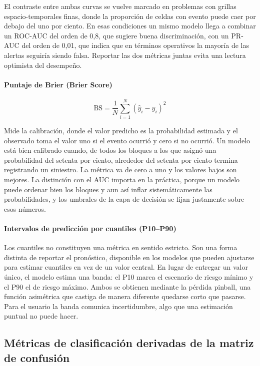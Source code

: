 El contraste entre ambas curvas se vuelve marcado en problemas con grillas espacio-temporales finas, donde la proporción de celdas con evento puede caer por debajo del uno por ciento. En esas condiciones un mismo modelo llega a combinar un ROC-AUC del orden de 0,8, que sugiere buena discriminación, con un PR-AUC del orden de 0,01, que indica que en términos operativos la mayoría de las alertas seguiría siendo falsa. Reportar las dos métricas juntas evita una lectura optimista del desempeño.

\paragraph{Puntaje de Brier (Brier Score)}

\begin{equation}
\mathrm{BS} = \frac{1}{N} \sum_{i=1}^{N} \left( \hat{y}_i - y_i \right)^{2}
\label{eq:brier}
\end{equation}

Mide la calibración, donde el valor predicho es la probabilidad estimada y el observado toma el valor uno si el evento ocurrió y cero si no ocurrió. Un modelo está bien calibrado cuando, de todos los bloques a los que asignó una probabilidad del setenta por ciento, alrededor del setenta por ciento termina registrando un siniestro. La métrica va de cero a uno y los valores bajos son mejores. La distinción con el AUC importa en la práctica, porque un modelo puede ordenar bien los bloques y aun así inflar sistemáticamente las probabilidades, y los umbrales de la capa de decisión se fijan justamente sobre esos números.

\paragraph{Intervalos de predicción por cuantiles (P10--P90)}

Los cuantiles no constituyen una métrica en sentido estricto. Son una forma distinta de reportar el pronóstico, disponible en los modelos que pueden ajustarse para estimar cuantiles en vez de un valor central. En lugar de entregar un valor único, el modelo estima una banda: el P10 marca el escenario de riesgo mínimo y el P90 el de riesgo máximo. Ambos se obtienen mediante la pérdida pinball, una función asimétrica que castiga de manera diferente quedarse corto que pasarse. Para el usuario la banda comunica incertidumbre, algo que una estimación puntual no puede hacer.

\subsection{Métricas de clasificación derivadas de la matriz de confusión}

